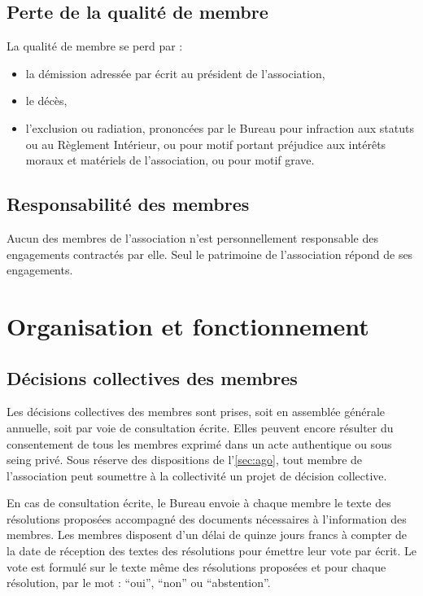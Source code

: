\documentclass[a4paper,french,10pt]{article}
\begin{document}
\subsection{Perte de la qualité de membre}
\label{sec:perte}
La qualité de membre se perd par :
\begin{itemize}
\item la démission adressée par écrit au président de l'association,

\item le décès,

\item l'exclusion ou radiation, prononcées par le Bureau pour infraction
aux statuts ou au Règlement Intérieur, ou pour motif portant préjudice
aux intérêts moraux et matériels de l'association, ou pour motif
grave.
\end{itemize}


\subsection{Responsabilité des membres}
\label{sec:responsabilite}
Aucun des membres de l’association n’est personnellement responsable
des engagements contractés par elle. Seul le patrimoine de
l’association répond de ses engagements.


\section{Organisation et fonctionnement}


\subsection{Décisions collectives des membres}
\label{sec:decisions}

Les décisions collectives des membres sont prises, soit en assemblée
générale annuelle, soit par voie de consultation écrite. Elles peuvent
encore résulter du consentement de tous les membres exprimé dans un
acte authentique ou sous seing privé. Sous réserve des dispositions de
l’\ref{sec:ago}, tout membre de l’association peut soumettre à la
collectivité un projet de décision collective.

En cas de consultation écrite, le Bureau envoie à chaque membre le
texte des résolutions proposées accompagné des documents nécessaires à
l’information des membres. Les membres disposent d’un délai de quinze
jours francs à compter de la date de réception des textes des
résolutions pour émettre leur vote par écrit. Le vote est formulé sur
le texte même des résolutions proposées et pour chaque résolution, par
le mot : “oui”, “non” ou “abstention”.
\end{document}
